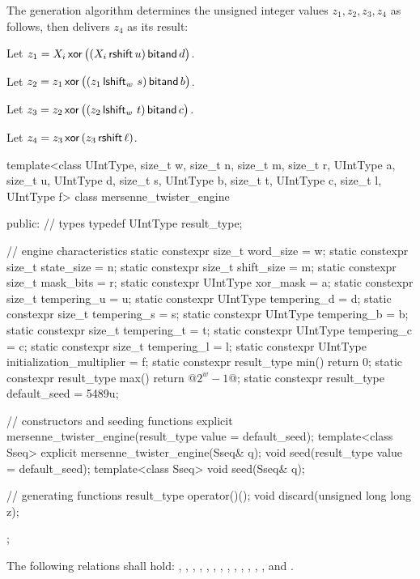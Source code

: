 \pnum
The generation algorithm%
%
 determines the unsigned integer values $z_1, z_2, z_3, z_4$ as follows,
 then delivers $z_4$ as its result:
\begin{enumeratea}
 \item
   Let $z_1 = X_i \, \mathsf{xor} \, \bigl(( X_i \, \mathsf{rshift} \, u ) \, \mathsf{bitand} \, d\bigr)$.
 \item
   Let $z_2 = z_1 \, \mathsf{xor} \, \bigl( (z_1 \, \mathsf{lshift}_w \, \, s) \, \mathsf{bitand} \, b \bigr)$.
 \item
   Let $z_3 = z_2 \, \mathsf{xor} \, \bigl( (z_2 \, \mathsf{lshift}_w \, \, t) \, \mathsf{bitand} \, c \bigr)$.
 \item
   Let $z_4 = z_3 \, \mathsf{xor} \, ( z_3 \, \mathsf{rshift} \, \ell )$.
\end{enumeratea}

\begin{codeblock}
template<class UIntType, size_t w, size_t n, size_t m, size_t r,
          UIntType a, size_t u, UIntType d, size_t s,
          UIntType b, size_t t,
          UIntType c, size_t l, UIntType f>
 class mersenne_twister_engine
{
public:
 // types
 typedef UIntType result_type;

 // engine characteristics
 static constexpr size_t word_size = w;
 static constexpr size_t state_size = n;
 static constexpr size_t shift_size = m;
 static constexpr size_t mask_bits = r;
 static constexpr UIntType xor_mask = a;
 static constexpr size_t tempering_u = u;
 static constexpr UIntType tempering_d = d;
 static constexpr size_t tempering_s = s;
 static constexpr UIntType tempering_b = b;
 static constexpr size_t tempering_t = t;
 static constexpr UIntType tempering_c = c;
 static constexpr size_t tempering_l = l;
 static constexpr UIntType initialization_multiplier = f;
 static constexpr result_type min() { return 0; }
 static constexpr result_type max() { return  @$2^w - 1$@; }
 static constexpr result_type default_seed = 5489u;

 // constructors and seeding functions
 explicit mersenne_twister_engine(result_type value = default_seed);
 template<class Sseq> explicit mersenne_twister_engine(Sseq& q);
 void seed(result_type value = default_seed);
 template<class Sseq> void seed(Sseq& q);

 // generating functions
 result_type operator()();
 void discard(unsigned long long z);
};
\end{codeblock}

\pnum
The following relations shall hold:
  ,
  ,
  ,
  ,
  ,
  ,
  ,
  ,
  ,
  ,
  ,
  ,
  ,
and
  .

